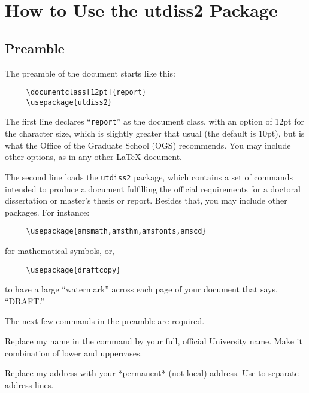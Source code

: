 \chapter{How to Use the utdiss2 Package}
%

\section{Preamble}
%

The preamble of the document starts like this:
\begin{verbatim}
     \documentclass[12pt]{report}
     \usepackage{utdiss2}
\end{verbatim}
%
%

The first line declares ``\texttt{report}'' as the document 
class, 
%
with an option of 12pt for the character size, 
which is slightly greater that usual (the default is 10pt), but is
what the Office of the Graduate School (OGS) recommends.
You may include other options, as in any other \LaTeX{} document.

The second line loads the \texttt{utdiss2} package, 
%
which contains a set of commands intended to produce a document fulfilling
the official requirements for a doctoral dissertation or master's thesis or
report. Besides that, you may include other packages. 
For instance:
\begin{verbatim}
     \usepackage{amsmath,amsthm,amsfonts,amscd}
\end{verbatim}
for mathematical symbols, or,
\begin{verbatim}
     \usepackage{draftcopy}
\end{verbatim}
to have a large ``watermark'' across each page of your document that
says, ``DRAFT.''


The next few commands in the preamble are required.

%
Replace my name in the command by your
full, official University name.  Make it combination of lower and uppercases.

%
Replace my address with your *permanent* (not local) address. Use
\texttt{\bslash\bslash} to separate address lines.

